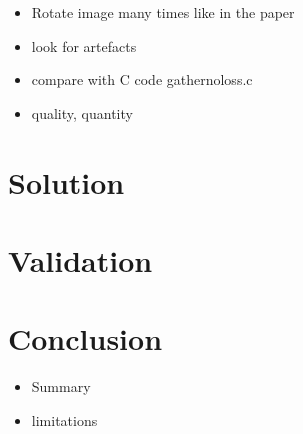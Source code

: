 \documentclass[]{usiinfbachelorproject}
\begin{document}
	
	\begin{itemize}
		\item Rotate image many times like in the paper
		\item look for artefacts
		\item compare with C code gathernoloss.c
		\item quality, quantity
	\end{itemize}
	
	
	\section{Solution}
	\section{Validation}
	\section{Conclusion}
	\begin{itemize}
		\item Summary
		\item limitations
	\end{itemize}
	
	
	
\end{document}
